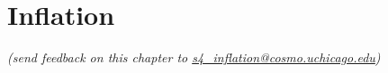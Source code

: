  
\chapter{Inflation}
\label{sec:inflation}


\begin{center}
{\small {\it (send feedback on this chapter to \href{mailto:s4\_inflation@cosmo.uchicago.edu}{s4\_inflation@cosmo.uchicago.edu})}}
\end{center}

